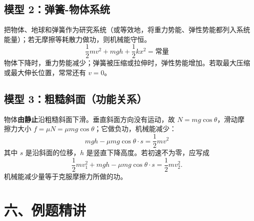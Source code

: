 \subsection*{模型 2：弹簧-物体系统}

把物体、地球和弹簧作为研究系统（或等效地，将重力势能、弹性势能都列入系统能量）；若无摩擦等耗散力做功，则机械能守恒。
\[
\frac12 mv^2 + mgh + \frac12 kx^2 = \text{常量}
\]
物体下降时，重力势能减少；弹簧被压缩或拉伸时，弹性势能增加。若取最大压缩或最大伸长位置，常常还有 $v=0$。

\begin{center}


\label{fig:spring-energy-system}
\end{center}

\subsection*{模型 3：粗糙斜面（功能关系）}

物体\textbf{由静止}沿粗糙斜面下滑。垂直斜面方向没有运动，故 $N=mg\cos\theta$，滑动摩擦力大小 $f=\mu N=\mu mg\cos\theta$；它做负功，机械能减少：
\[
mgh - \mu mg\cos\theta \cdot s = \frac12 mv^2
\]
其中 $s$ 是沿斜面的位移，$h$ 是竖直下降高度。若初速不为零，应写成
\[
\frac12mv_1^2+mgh-\mu mg\cos\theta\cdot s=\frac12mv_2^2.
\]
机械能减少量等于克服摩擦力所做的功。

\begin{center}


\label{fig:rough-incline-energy}
\end{center}

\section*{六、例题精讲}

